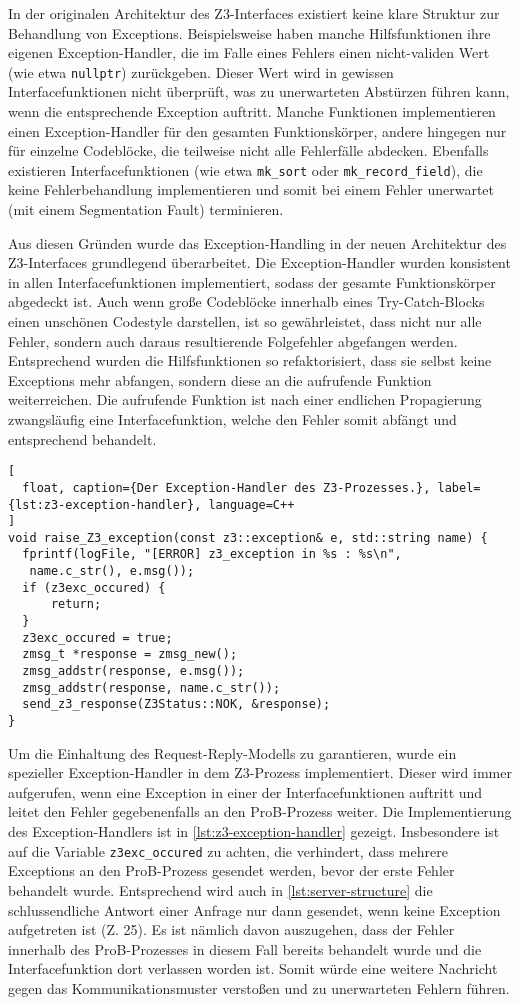 In der originalen Architektur des Z3-Interfaces existiert keine klare Struktur zur Behandlung von Exceptions.
Beispielsweise haben manche Hilfsfunktionen ihre eigenen Exception-Handler, die im Falle eines Fehlers einen nicht-validen Wert (wie etwa \texttt{nullptr}) zurückgeben.
Dieser Wert wird in gewissen Interfacefunktionen nicht überprüft, was zu unerwarteten Abstürzen führen kann, wenn die entsprechende Exception auftritt.
Manche Funktionen implementieren einen Exception-Handler für den gesamten Funktionskörper, andere hingegen nur für einzelne Codeblöcke, die teilweise nicht alle Fehlerfälle abdecken.
Ebenfalls existieren Interfacefunktionen (wie etwa \texttt{mk\_sort} oder \texttt{mk\_record\_field}), die keine Fehlerbehandlung implementieren und somit bei einem Fehler unerwartet (mit einem Segmentation Fault) terminieren.

Aus diesen Gründen wurde das Exception-Handling in der neuen Architektur des Z3-Interfaces grundlegend überarbeitet.
Die Exception-Handler wurden konsistent in allen Interfacefunktionen implementiert, sodass der gesamte Funktionskörper abgedeckt ist.
Auch wenn große Codeblöcke innerhalb eines Try-Catch-Blocks einen unschönen Codestyle darstellen,
ist so gewährleistet, dass nicht nur alle Fehler, sondern auch daraus resultierende Folgefehler abgefangen werden.
Entsprechend wurden die Hilfsfunktionen so refaktorisiert, dass sie selbst keine Exceptions mehr abfangen, sondern diese an die aufrufende Funktion weiterreichen.
Die aufrufende Funktion ist nach einer endlichen Propagierung zwangsläufig eine Interfacefunktion, welche den Fehler somit abfängt und entsprechend behandelt.

\begin{lstlisting}[
  float, caption={Der Exception-Handler des Z3-Prozesses.}, label={lst:z3-exception-handler}, language=C++
]
void raise_Z3_exception(const z3::exception& e, std::string name) {
  fprintf(logFile, "[ERROR] z3_exception in %s : %s\n",
   name.c_str(), e.msg());
  if (z3exc_occured) {
      return;
  }
  z3exc_occured = true;
  zmsg_t *response = zmsg_new();
  zmsg_addstr(response, e.msg());
  zmsg_addstr(response, name.c_str());
  send_z3_response(Z3Status::NOK, &response);
}
\end{lstlisting}

Um die Einhaltung des Request-Reply-Modells zu garantieren, wurde ein spezieller Exception-Handler in dem Z3-Prozess implementiert.
Dieser wird immer aufgerufen, wenn eine Exception in einer der Interfacefunktionen auftritt und leitet den Fehler gegebenenfalls an den ProB-Prozess weiter.
Die Implementierung des Exception-Handlers ist in \cref{lst:z3-exception-handler} gezeigt.
Insbesondere ist auf die Variable \texttt{z3exc\_occured} zu achten, die verhindert, dass mehrere Exceptions an den ProB-Prozess gesendet werden, bevor der erste Fehler behandelt wurde.
Entsprechend wird auch in \cref{lst:server-structure} die schlussendliche Antwort einer Anfrage nur dann gesendet, wenn keine Exception aufgetreten ist (Z. 25).
Es ist nämlich davon auszugehen, dass der Fehler innerhalb des ProB-Prozesses in diesem Fall bereits behandelt wurde und die Interfacefunktion dort verlassen worden ist.
Somit würde eine weitere Nachricht gegen das Kommunikationsmuster verstoßen und zu unerwarteten Fehlern führen.


